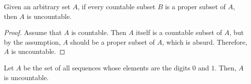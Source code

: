 \documentclass{article}
\begin{document}
  \begin{theorem}
    Given an arbitrary set $A$, if every countable subset $B$ is a proper subset of $A$, then $A$ is uncountable. 
  \end{theorem}
  \begin{proof}
    Assume that $A$ is countable. Then $A$ itself is a countable subset of $A$, but by the assumption, $A$ should be a proper subset of $A$, which is absurd. Therefore, $A$ is uncountable. 
  \end{proof}

  \begin{theorem}
    Let $A$ be the set of all sequences whose elements are the digits $0$ and $1$. Then, $A$ is uncountable. 
  \end{theorem}
\end{document}

